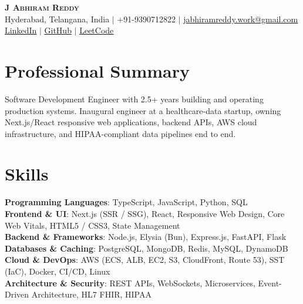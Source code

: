 \documentclass[letterpaper,11pt]{article}
\begin{document}
\begin{center}
    \textbf{\Huge \scshape J Abhiram Reddy} \\ \vspace{2pt}
    \small Hyderabad, Telangana, India $|$ +91-9390712822 $|$ \href{mailto:jabhiramreddy.work@gmail.com}{\underline{jabhiramreddy.work@gmail.com}} \\ \vspace{2pt}
    \href{https://linkedin.com/in/j-abhiram-reddy}{\underline{LinkedIn}} $|$ \href{https://github.com/jabhiramreddy-code}{\underline{GitHub}} $|$ \href{https://leetcode.com/J_Abhiram_reddy/}{\underline{LeetCode}}
\end{center}

\section{Professional Summary}
Software Development Engineer with 2.5+ years building and operating production systems. Inaugural engineer at a healthcare-data startup, owning Next.js/React responsive web applications, backend APIs, AWS cloud infrastructure, and HIPAA-compliant data pipelines end to end.

\section{Skills}
 \begin{itemize}[leftmargin=0.15in, label={}]
    \small{\item{
     \textbf{Programming Languages}{: TypeScript, JavaScript, Python, SQL} \\ [2pt]
     \textbf{Frontend \& UI}{: Next.js (SSR / SSG), React, Responsive Web Design, Core Web Vitals, HTML5 / CSS3, State Management} \\[2pt]
     \textbf{Backend \& Frameworks}{: Node.js, Elysia (Bun), Express.js, FastAPI, Flask} \\[2pt]
     \textbf{Databases \& Caching}{: PostgreSQL, MongoDB, Redis, MySQL, DynamoDB} \\[2pt]
     \textbf{Cloud \& DevOps}{: AWS (ECS, ALB, EC2, S3, CloudFront, Route 53), SST (IaC), Docker, CI/CD, Linux} \\[2pt]
     \textbf{Architecture \& Security}{: REST APIs, WebSockets, Microservices, Event-Driven Architecture, HL7 FHIR, HIPAA}
    }}
 \end{itemize}
\end{document}
